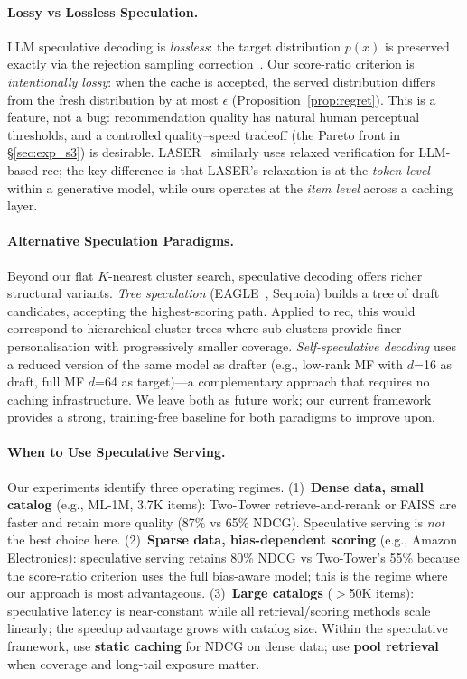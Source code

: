 \documentclass[sigconf,nonacm=false]{acmart}
\begin{document}
\paragraph{Lossy vs Lossless Speculation.}
LLM speculative decoding is \emph{lossless}: the target distribution $p(x)$ is preserved exactly via the rejection sampling correction~\cite{leviathan2023}. Our score-ratio criterion is \emph{intentionally lossy}: when the cache is accepted, the served distribution differs from the fresh distribution by at most $\epsilon$ (Proposition~\ref{prop:regret}). This is a feature, not a bug: recommendation quality has natural human perceptual thresholds, and a controlled quality--speed tradeoff (the Pareto front in \S\ref{sec:exp_s3}) is desirable. LASER~\cite{laser2025} similarly uses relaxed verification for LLM-based rec; the key difference is that LASER's relaxation is at the \emph{token level} within a generative model, while ours operates at the \emph{item level} across a caching layer.

\paragraph{Alternative Speculation Paradigms.}
Beyond our flat $K$-nearest cluster search, speculative decoding offers richer structural variants. \emph{Tree speculation} (EAGLE~\cite{sequoia2024}, Sequoia) builds a tree of draft candidates, accepting the highest-scoring path. Applied to rec, this would correspond to hierarchical cluster trees where sub-clusters provide finer personalisation with progressively smaller coverage. \emph{Self-speculative decoding} uses a reduced version of the same model as drafter (e.g., low-rank MF with $d$=16 as draft, full MF $d$=64 as target)---a complementary approach that requires no caching infrastructure. We leave both as future work; our current framework provides a strong, training-free baseline for both paradigms to improve upon.

\paragraph{When to Use Speculative Serving.}
Our experiments identify three operating regimes.
(1)~\textbf{Dense data, small catalog} (e.g., ML-1M, 3.7K items): Two-Tower retrieve-and-rerank or FAISS are faster and retain more quality (87\% vs 65\% NDCG). Speculative serving is \emph{not} the best choice here.
(2)~\textbf{Sparse data, bias-dependent scoring} (e.g., Amazon Electronics): speculative serving retains 80\% NDCG vs Two-Tower's 55\% because the score-ratio criterion uses the full bias-aware model; this is the regime where our approach is most advantageous.
(3)~\textbf{Large catalogs} ($>$50K items): speculative latency is near-constant while all retrieval/scoring methods scale linearly; the speedup advantage grows with catalog size.
Within the speculative framework, use \textbf{static caching} for NDCG on dense data; use \textbf{pool retrieval} when coverage and long-tail exposure matter.
\end{document}
